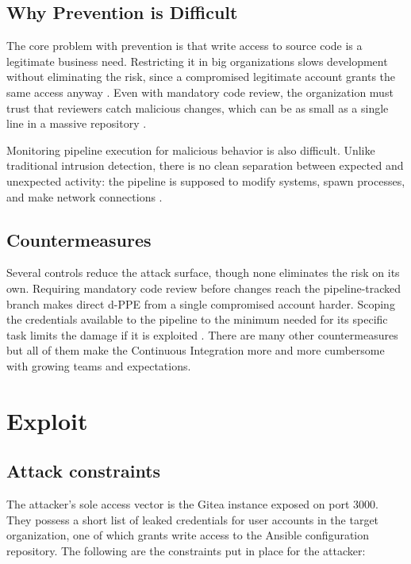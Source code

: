 \documentclass{article}
\begin{document}
\subsection{Why Prevention is Difficult}

The core problem with prevention is that write access to source code is a legitimate business need. Restricting it in big organizations slows development without eliminating the risk, since a compromised legitimate account grants the same access anyway \cite{owaspPPE}. Even with mandatory code review, the organization must trust that reviewers catch malicious changes, which can be as small as a single line in a massive repository \cite{bishopFoxPPE}.

Monitoring pipeline execution for malicious behavior is also difficult. Unlike traditional intrusion detection, there is no clean separation between expected and unexpected activity: the pipeline is supposed to modify systems, spawn processes, and make network connections \cite{owaspPPE}.

\subsection{Countermeasures}

Several controls reduce the attack surface, though none eliminates the risk on its own. Requiring mandatory code review before changes reach the pipeline-tracked branch makes direct d-PPE from a single compromised account harder. Scoping the credentials available to the pipeline to the minimum needed for its specific task  limits the damage if it is exploited \cite{owaspPPE5}. There are many other countermeasures but all of them make the Continuous Integration more and more cumbersome with growing teams and expectations. 

\section{Exploit}

\subsection{Attack constraints}
The attacker's sole access vector is the Gitea \cite{giteaDocs} instance exposed on port 3000. They possess a short list of leaked credentials for user accounts in the target organization, one of which grants write access to the Ansible \cite{ansibleDocs} configuration repository. The following are the constraints put in place for the attacker:
\end{document}
